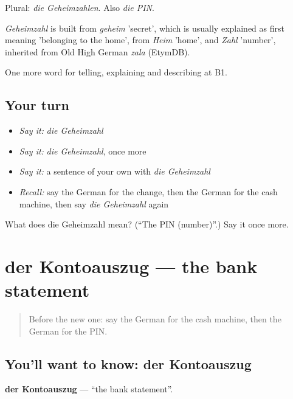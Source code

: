 Plural: \emph{die Geheimzahlen}. Also \emph{die PIN}.

\begin{cousinweb}
\emph{Geheimzahl} is built from \emph{geheim} 'secret', which is usually explained as first meaning 'belonging to the home', from \emph{Heim} 'home', and \emph{Zahl} 'number', inherited from Old High German \emph{zala} (EtymDB).
\end{cousinweb}

\begin{grammarlens}[title={What you've built}]
One more word for telling, explaining and describing at B1.
\end{grammarlens}

\subsection*{Your turn}
\begin{itemize}
\raggedright
  \item \emph{Say it:} \emph{die Geheimzahl}
  \item \emph{Say it:} \emph{die Geheimzahl}, once more
  \item \emph{Say it:} a sentence of your own with \emph{die Geheimzahl}
  \item \emph{Recall:} say the German for the change, then the German for the cash machine, then say \emph{die Geheimzahl} again
\end{itemize}

\begin{tcolorbox}[breakable,colback=teal!4,colframe=teal!35!black,title={Before you move on}]
What does die Geheimzahl mean? (\textquotedblleft{}The PIN (number)\textquotedblright{}.) Say it once more.
\end{tcolorbox}
\section[der Kontoauszug]{der Kontoauszug — the bank statement}

\label{lesson:GE-C450-kontoauszug}



\begin{quote}
Before the new one: say the German for the cash machine, then the German for the PIN.
\end{quote}

\subsection*{You'll want to know: der Kontoauszug}
\textbf{der Kontoauszug} — \textquotedblleft{}the bank statement\textquotedblright{}.

